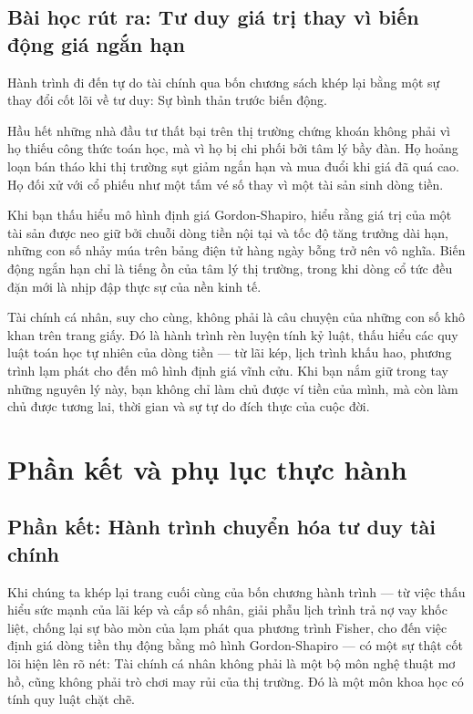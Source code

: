 \documentclass[14pt, a4paper, oneside]{extreport}
\begin{document}
\section{Bài học rút ra: Tư duy giá trị thay vì biến động giá ngắn hạn}

Hành trình đi đến tự do tài chính qua bốn chương sách khép lại bằng một sự thay đổi cốt lõi về tư duy: Sự bình thản trước biến động.

Hầu hết những nhà đầu tư thất bại trên thị trường chứng khoán không phải vì họ thiếu công thức toán học, mà vì họ bị chi phối bởi tâm lý bầy đàn. Họ hoảng loạn bán tháo khi thị trường sụt giảm ngắn hạn và mua đuổi khi giá đã quá cao. Họ đối xử với cổ phiếu như một tấm vé số thay vì một tài sản sinh dòng tiền.

Khi bạn thấu hiểu mô hình định giá Gordon-Shapiro, hiểu rằng giá trị của một tài sản được neo giữ bởi chuỗi dòng tiền nội tại và tốc độ tăng trưởng dài hạn, những con số nhảy múa trên bảng điện tử hàng ngày bỗng trở nên vô nghĩa. Biến động ngắn hạn chỉ là tiếng ồn của tâm lý thị trường, trong khi dòng cổ tức đều đặn mới là nhịp đập thực sự của nền kinh tế.

Tài chính cá nhân, suy cho cùng, không phải là câu chuyện của những con số khô khan trên trang giấy. Đó là hành trình rèn luyện tính kỷ luật, thấu hiểu các quy luật toán học tự nhiên của dòng tiền --- từ lãi kép, lịch trình khấu hao, phương trình lạm phát cho đến mô hình định giá vĩnh cửu. Khi bạn nắm giữ trong tay những nguyên lý này, bạn không chỉ làm chủ được ví tiền của mình, mà còn làm chủ được tương lai, thời gian và sự tự do đích thực của cuộc đời.

\chapter*{Phần kết và phụ lục thực hành}

\section*{Phần kết: Hành trình chuyển hóa tư duy tài chính}

Khi chúng ta khép lại trang cuối cùng của bốn chương hành trình --- từ việc thấu hiểu sức mạnh của lãi kép và cấp số nhân, giải phẫu lịch trình trả nợ vay khốc liệt, chống lại sự bào mòn của lạm phát qua phương trình Fisher, cho đến việc định giá dòng tiền thụ động bằng mô hình Gordon-Shapiro --- có một sự thật cốt lõi hiện lên rõ nét: Tài chính cá nhân không phải là một bộ môn nghệ thuật mơ hồ, cũng không phải trò chơi may rủi của thị trường. Đó là một môn khoa học có tính quy luật chặt chẽ.
\end{document}
